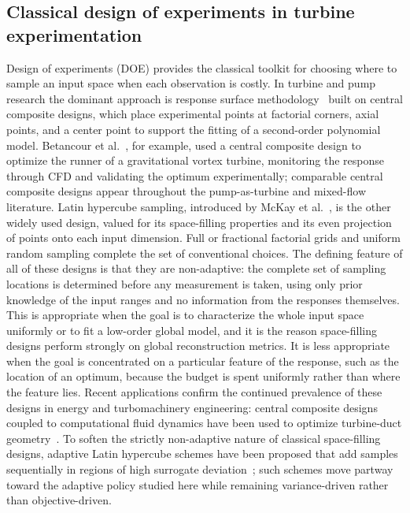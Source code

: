 \documentclass[preprint,12pt]{elsarticle}
\begin{document}
\subsection{Classical design of experiments in turbine experimentation}
Design of experiments (DOE) provides the classical toolkit for choosing where to
sample an input space when each observation is costly. In turbine and pump research
the dominant approach is response surface methodology~\cite{box1951rsm} built on
central composite designs, which place experimental points at factorial corners,
axial points, and a center point to support the fitting of a second-order polynomial
model. Betancour et al.~\cite{betancour2023vortex}, for example, used a central
composite design to optimize the runner of a gravitational vortex turbine, monitoring
the response through CFD and validating the optimum experimentally; comparable
central composite designs appear throughout the pump-as-turbine and mixed-flow
literature. Latin hypercube sampling, introduced by McKay et al.~\cite{mckay1979lhs},
is the other widely used design, valued for its space-filling properties and its even
projection of points onto each input dimension. Full or fractional factorial grids
and uniform random sampling complete the set of conventional choices. The defining
feature of all of these designs is that they are non-adaptive: the complete set of
sampling locations is determined before any measurement is taken, using only prior
knowledge of the input ranges and no information from the responses themselves. This
is appropriate when the goal is to characterize the whole input space uniformly or to
fit a low-order global model, and it is the reason space-filling designs perform
strongly on global reconstruction metrics. It is less appropriate when the goal is
concentrated on a particular feature of the response, such as the location of an
optimum, because the budget is spent uniformly rather than where the feature lies.
Recent applications confirm the continued prevalence of these designs in energy and
turbomachinery engineering: central composite designs coupled to computational fluid
dynamics have been used to optimize turbine-duct geometry~\cite{taghinezhad2023duct}.
To soften the strictly non-adaptive nature of classical space-filling designs,
adaptive Latin hypercube schemes have been proposed that add samples sequentially in
regions of high surrogate deviation~\cite{borisut2023adaptivelhs}; such schemes move
partway toward the adaptive policy studied here while remaining variance-driven
rather than objective-driven.
\end{document}
